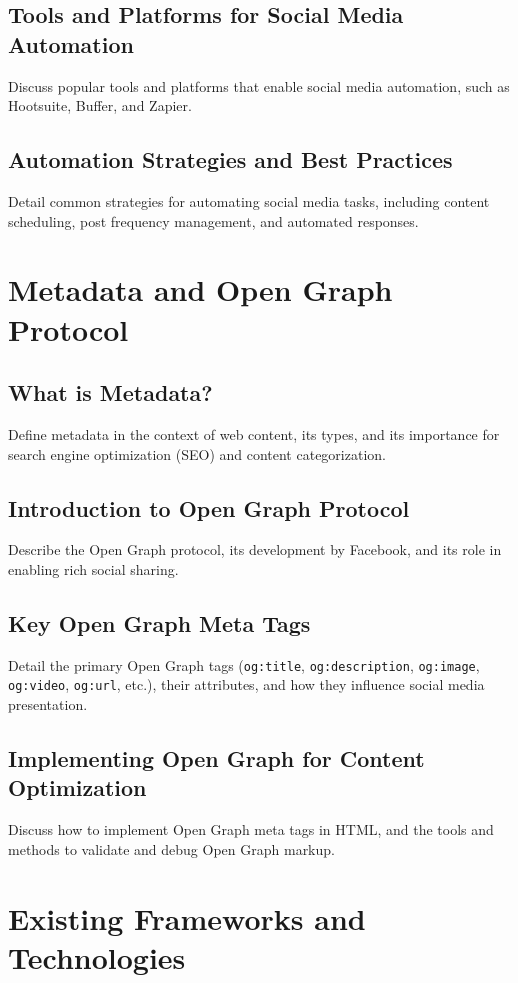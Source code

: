\subsection{Tools and Platforms for Social Media Automation}
Discuss popular tools and platforms that enable social media automation, such as Hootsuite, Buffer, and Zapier.

\subsection{Automation Strategies and Best Practices}
Detail common strategies for automating social media tasks, including content scheduling, post frequency management, and automated responses.

\section{Metadata and Open Graph Protocol}
\label{sec:metadata-open-graph}
\subsection{What is Metadata?}
Define metadata in the context of web content, its types, and its importance for search engine optimization (SEO) and content categorization.

\subsection{Introduction to Open Graph Protocol}
Describe the Open Graph protocol, its development by Facebook, and its role in enabling rich social sharing.

\subsection{Key Open Graph Meta Tags}
Detail the primary Open Graph tags (\texttt{og:title}, \texttt{og:description}, \texttt{og:image}, \texttt{og:video}, \texttt{og:url}, etc.), their attributes, and how they influence social media presentation.

\subsection{Implementing Open Graph for Content Optimization}
Discuss how to implement Open Graph meta tags in HTML, and the tools and methods to validate and debug Open Graph markup.

\section{Existing Frameworks and Technologies}
\label{sec:frameworks-technologies}
